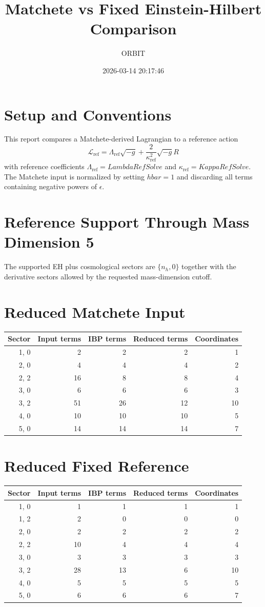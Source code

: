 \documentclass[11pt]{article}
\title{Matchete vs Fixed Einstein-Hilbert Comparison}
\author{ORBIT}
\date{2026-03-14 20:17:46}
\begin{document}
\maketitle
\tableofcontents
\section{Setup and Conventions}
This report compares a Matchete-derived Lagrangian to a reference action
\begin{equation}
\mathcal{L}_{\mathrm{ref}} = \Lambda_{\mathrm{ref}} \sqrt{-g} + \frac{2}{\kappa_{\mathrm{ref}}^2} \sqrt{-g} R
\end{equation}
with reference coefficients $\Lambda_{\mathrm{ref}} = LambdaRefSolve$ and $\kappa_{\mathrm{ref}} = KappaRefSolve$.
The Matchete input is normalized by setting $hbar = 1$ and discarding all terms containing negative powers of $\epsilon$.
\section{Reference Support Through Mass Dimension 5}
The supported EH plus cosmological sectors are $\{n_h, 0\}$ together with the derivative sectors allowed by the requested mass-dimension cutoff.
\section{Reduced Matchete Input}
\begin{longtable}{rrrrr}
\toprule
Sector & Input terms & IBP terms & Reduced terms & Coordinates \\
\midrule
{1, 0} & 2 & 2 & 2 & 1 \\
{2, 0} & 4 & 4 & 4 & 2 \\
{2, 2} & 16 & 8 & 8 & 4 \\
{3, 0} & 6 & 6 & 6 & 3 \\
{3, 2} & 51 & 26 & 12 & 10 \\
{4, 0} & 10 & 10 & 10 & 5 \\
{5, 0} & 14 & 14 & 14 & 7 \\
\bottomrule
\end{longtable}
\section{Reduced Fixed Reference}
\begin{longtable}{rrrrr}
\toprule
Sector & Input terms & IBP terms & Reduced terms & Coordinates \\
\midrule
{1, 0} & 1 & 1 & 1 & 1 \\
{1, 2} & 2 & 0 & 0 & 0 \\
{2, 0} & 2 & 2 & 2 & 2 \\
{2, 2} & 10 & 4 & 4 & 4 \\
{3, 0} & 3 & 3 & 3 & 3 \\
{3, 2} & 28 & 13 & 6 & 10 \\
{4, 0} & 5 & 5 & 5 & 5 \\
{5, 0} & 6 & 6 & 6 & 7 \\
\bottomrule
\end{longtable}
\end{document}
